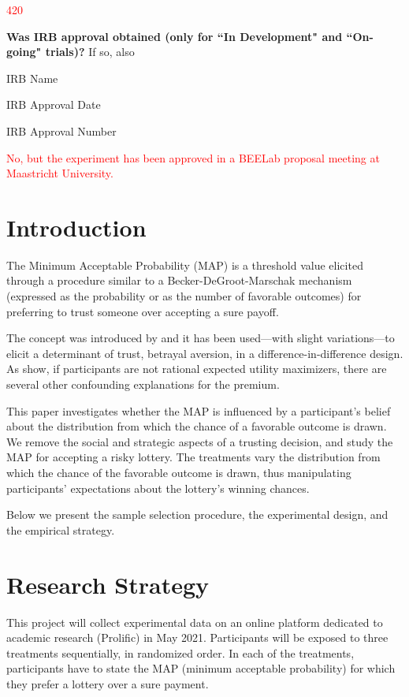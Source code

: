 \textcolor{red}{420}
    
\noindent \textcolor{NavyBlue}{\textbf{Was IRB approval obtained (only for ``In Development" and ``On-going" trials)?}} If so, also

        IRB Name
        
        IRB Approval Date
        
        IRB Approval Number
        
\textcolor{red}{No, but the experiment has been approved in a BEELab proposal meeting at Maastricht University.}





\section{Introduction}
The Minimum Acceptable Probability (MAP) is a threshold value elicited through a procedure similar to a Becker-DeGroot-Marschak mechanism (expressed as the probability or as the number of favorable outcomes) for preferring to trust someone over accepting a sure payoff.

The concept was introduced by \cite{Bohnet2004} and it has been used—with slight variations—to elicit a determinant of trust, betrayal aversion, in a difference-in-difference design.
As \cite{Li2020a} show, if participants are not rational expected utility maximizers, there are several other confounding explanations for the premium.

This paper investigates whether the MAP is influenced by a participant’s belief about the distribution from which the chance of a favorable outcome is drawn. 
We remove the social and strategic aspects of a trusting decision, and study the MAP for accepting a risky lottery.
The treatments vary the distribution from which the chance of the favorable outcome is drawn, thus manipulating participants’ expectations about the lottery’s winning chances.


Below we present the sample selection procedure, the experimental design, and the empirical strategy.



\section{Research Strategy}
This project will collect experimental data on an online platform dedicated to academic research (Prolific) in May 2021. Participants will be exposed to three treatments sequentially, in randomized order.
In each of the treatments, participants have to state the MAP (minimum acceptable probability) for which they prefer a lottery over a sure payment.

